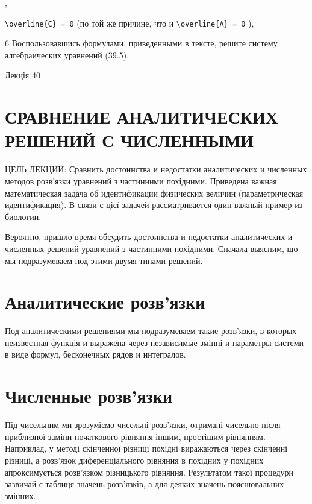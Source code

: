 \documentclass[
  ukrainian,
]{article}
\begin{document}
,

\texttt{\textbackslash{}overline\{C\}\ =\ 0} (по той же причине, что и
\texttt{\textbackslash{}overline\{A\}\ =\ 0} ),

6 Воспользовавшись формулами, приведенными в тексте, решите систему
алгебраических уравнений (39.5).

Лекція 40

\section{СРАВНЕНИЕ АНАЛИТИЧЕСКИХ РЕШЕНИЙ С
ЧИСЛЕННЫМИ}\label{ux441ux440ux430ux432ux43dux435ux43dux438ux435-ux430ux43dux430ux43bux438ux442ux438ux447ux435ux441ux43aux438ux445-ux440ux435ux448ux435ux43dux438ux439-ux441-ux447ux438ux441ux43bux435ux43dux43dux44bux43cux438}

ЦЕЛЬ ЛЕКЦИИ: Сравнить достоинства и недостатки аналитических и численных
методов розв'язки уравнений з частинними похідними. Приведена важная
математическая задача об идентификации физических величин
(параметрическая идентификация). В связи с цієї задачей рассматривается
один важный пример из биологии.

Вероятно, пришло время обсудить достоинства и недостатки аналитических и
численных решений уравнений з частинними похідними. Сначала выясним, що
мы подразумеваем под этими двумя типами решений.

\section{Аналитические
розв'язки}\label{ux430ux43dux430ux43bux438ux442ux438ux447ux435ux441ux43aux438ux435-ux440ux43eux437ux432ux44fux437ux43aux438}

Под аналитическими решениями мы подразумеваем такие розв'язки, в которых
неизвестная функція и выражена через независимые змінні и параметры
системи в виде формул, бесконечных рядов и интегралов.

\section{Численные
розв'язки}\label{ux447ux438ux441ux43bux435ux43dux43dux44bux435-ux440ux43eux437ux432ux44fux437ux43aux438}

Під чисельним ми зрозуміємо чисельні розв'язки, отримані чисельно після
приблизної заміни початкового рівняння іншим, простішим рівнянням.
Наприклад, у методі скінченної різниці похідні виражаються через
скінченні різниці, а розв'язок диференціального рівняння в похідних у
похідних апроксимується розв'язком різницького рівняння. Результатом
такої процедури зазвичай є таблиця значень розв'язків, а для деяких
значень пояснювальних змінних.
\end{document}
